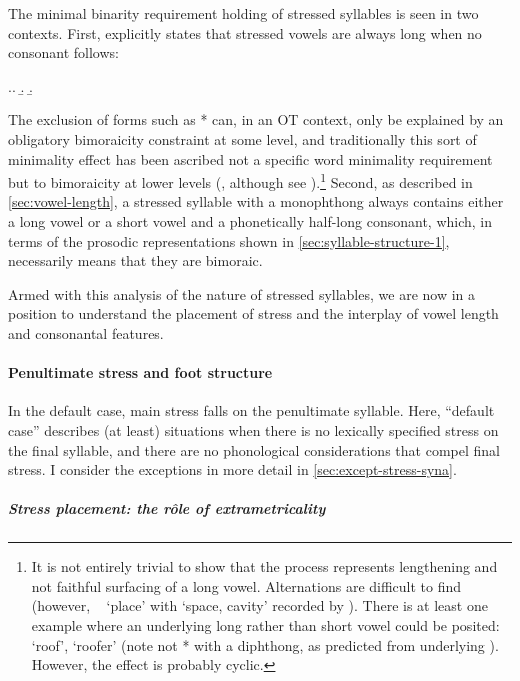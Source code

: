 The minimal binarity requirement holding of stressed syllables is seen in two contexts. First, \citet{awbery86:_pembr_welsh} explicitly states that stressed vowels are always long when no consonant follows:

\ex.\a.
\b.
\b.

The exclusion of forms such as *\ipa{[ˈda]} can, in an OT context, only be explained by an obligatory bimoraicity constraint at some level, and traditionally this sort of minimality effect has been ascribed not a specific word minimality requirement but to bimoraicity at lower levels (\citealp{pm1}, although see \citealp{downing06}).\footnote{It is not entirely trivial to show that the process represents lengthening and not faithful surfacing of a long vowel. Alternations are difficult to find (however, \cf\ \ipa{[ˈɬeː]} `place' with \ipa{[ˈɡwaɡle]} `space, cavity' recorded by \citealt[\emph{sub voce}]{thomas00:_welsh}). There is at least one example where an underlying long rather than short vowel could be posited: \ipa{[ˈtoː]} `roof', \ipa{[ˈtoːur]} `roofer' (note not *\ipa{[ˈtour]} with a diphthong, as predicted from underlying ). However, the effect is probably cyclic.} Second, as described in \cref{sec:vowel-length}, a stressed syllable with a monophthong always contains either a long vowel or a short vowel and a phonetically half-long consonant, which, in terms of the prosodic representations shown in \cref{sec:syllable-structure-1}, necessarily means that they are bimoraic.

Armed with this analysis of the nature of stressed syllables, we are now in a position to understand the placement of stress and the interplay of vowel length and consonantal features.

\paragraph{Penultimate stress and foot structure}
\label{sec:penult-stress-foot}

In the default case, main stress falls on the penultimate syllable. Here, \enquote{default case} describes (at least) situations when there is no lexically specified stress on the final syllable, and there are no phonological considerations that compel final stress. I consider the exceptions in more detail in \cref{sec:except-stress-syna}.

\subparagraph{Stress placement: the rôle of extrametricality}
\label{sec:stress-plac-syll}

